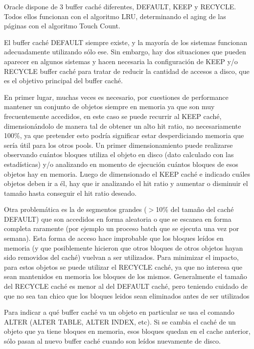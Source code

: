 \documentclass[a4paper,10pt]{article}
\begin{document}
Oracle dispone de 3 buffer caché diferentes, DEFAULT, KEEP y RECYCLE. Todos ellos funcionan con el algoritmo LRU, determinando el aging de las páginas con el algoritmo Touch Count.

El buffer caché DEFAULT siempre existe, y la mayoría de los sistemas funcionan adecuadamente utilizando sólo ese. Sin embargo, hay dos situaciones que pueden aparecer en algunos sistemas y hacen necesaria la configuración de KEEP y/o RECYCLE buffer caché para tratar de reducir la cantidad de accesos a disco, que es el objetivo principal del buffer caché.

En primer lugar, muchas veces es necesario, por cuestiones de performance mantener un conjunto de objetos siempre en memoria ya que son muy frecuentemente accedidos, en este caso se puede recurrir al KEEP caché, dimensionándolo de manera tal de obtener un alto hit ratio, no necesariamente 100\%, ya que pretender esto podría significar estar desperdiciando memoria que sería útil para los otros pools. Un primer  dimensionamiento puede realizarse observando cuántos bloques utiliza el objeto en disco (dato calculado con las estadísticas) y/o analizando en momento de ejecución cuántos bloques de esos objetos hay en memoria. Luego de dimensionado el KEEP caché e indicado cuáles objetos deben ir a él, hay que ir analizando el hit ratio y aumentar o disminuir el tamaño hasta conseguir el hit ratio deseado.

Otra problemática es la de segmentos grandes ($>$10\% del tamaño del caché DEFAULT) que son accedidos en forma aleatoria o que se escanea en forma completa raramente (por ejemplo un proceso batch que se ejecuta una vez por semana). Esta forma de acceso hace  improbable que los bloques leídos en memoria (y que posiblemente hicieron que otros bloques de otros objetos hayan sido removidos del caché) vuelvan a ser utilizados. Para minimizar el impacto, para estos objetos se puede utilizar el RECYCLE caché, ya que no interesa que sean mantenidos en memoria los bloques de los mismos. Generalmente el tamaño del RECYCLE caché es menor al del DEFAULT caché, pero teniendo cuidado de que no sea tan chico que los bloques leidos sean eliminados antes de ser utilizados

Para indicar a qué buffer caché va un objeto en particular se usa el comando ALTER (ALTER TABLE, ALTER INDEX, etc). Si se cambia el caché de un objeto que ya tiene bloques en memoria, esos bloques quedan en el cache anterior, sólo pasan al nuevo buffer caché cuando son leídos nuevamente de disco.
\end{document}
